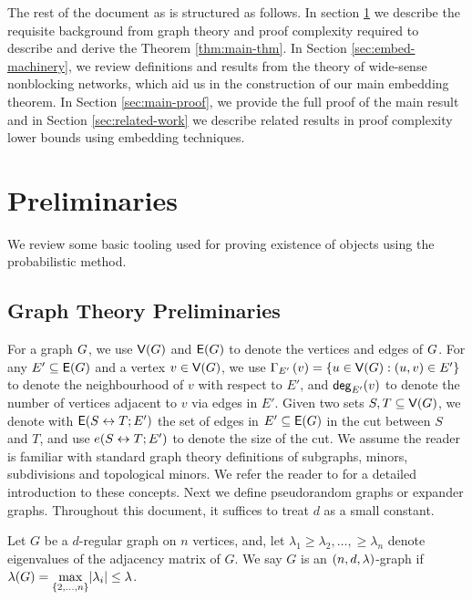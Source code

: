 \documentclass[11pt]{article}
\begin{document}
The rest of the document as is structured as follows. In section \ref{sec:prelims} we describe the requisite background from graph theory and proof complexity required to describe and derive the Theorem \ref{thm:main-thm}.
In Section \ref{sec:embed-machinery}, we review definitions and results from the theory of wide-sense nonblocking networks, which aid us in the construction of our main embedding theorem.
In Section \ref{sec:main-proof}, we provide the full proof of the main result and in Section \ref{sec:related-work} we describe related results in proof complexity lower bounds using embedding techniques.


\section{Preliminaries}
\label{sec:prelims}

We review some basic tooling used for proving existence of objects using the probabilistic method.




\subsection{Graph Theory Preliminaries}
\label{sec:graph-theory-prelims}

For a graph $G$, we use $\mathsf{V}(G)$ and $\mathsf{E}(G)$ to denote the vertices and edges of $G$. 
For any $E' \subseteq \mathsf{E}(G)$ and a vertex $v \in \mathsf{V}(G)$, we use $\Gamma_{E'}\left(v\right) = \{ u \in \mathsf{V}(G) : (u,v) \in E' \}$ to denote the neighbourhood of $v$ with respect to $E'$, and $\mathsf{deg}_{E'}(v)$ to denote the number of vertices adjacent to $v$ via edges in $E'$.
Given two sets $S, T \subseteq \mathsf{V}(G)$, we denote with $\mathsf{E}(S \leftrightarrow T; E')$ the set of edges in $E' \subseteq \mathsf{E}(G)$ in the cut between $S$ and $T$, and use $e(S \leftrightarrow T; E')$ to denote the size of the cut.
We assume the reader is familiar with standard graph theory definitions of subgraphs, minors, subdivisions and  topological minors.
We refer the reader to \citep{bollobas2012graph} for a detailed introduction to these concepts.
Next we define pseudorandom graphs or expander graphs. 
Throughout this document, it suffices to treat $d$ as a small constant.

\begin{definition}\label{def:expander-graphs}
Let $G$ be a $d$-regular graph on $n$ vertices, and, let $\lambda_1 \geq \lambda_2, \dots, \geq \lambda_n$ denote eigenvalues of the adjacency matrix of $G$.
We say $G$ is an $(n, d, \lambda)$-graph if $\lambda(G) = \underset{{\{2, \dots, n\}}}{\max}|\lambda_i| \leq \lambda$.
\end{definition}
\end{document}

